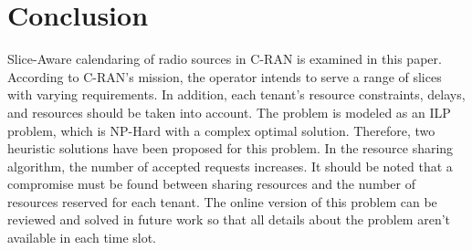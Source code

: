 \documentclass[conference]{IEEEtran}
\begin{document}
\section{Conclusion}
Slice-Aware calendaring of radio sources in C-RAN is examined in this paper. According to C-RAN's mission, the operator intends to serve a range of slices with varying requirements. In addition, each tenant's resource constraints, delays, and resources should be taken into account. The problem is modeled as an ILP problem, which is NP-Hard with a complex optimal solution. Therefore, two heuristic solutions have been proposed for this problem. In the resource sharing algorithm, the number of accepted requests increases. It should be noted that a compromise must be found between sharing resources and the number of resources reserved for each tenant. The online version of this problem can be reviewed and solved in future work so that all details about the problem aren't available in each time slot.




\end{document}
